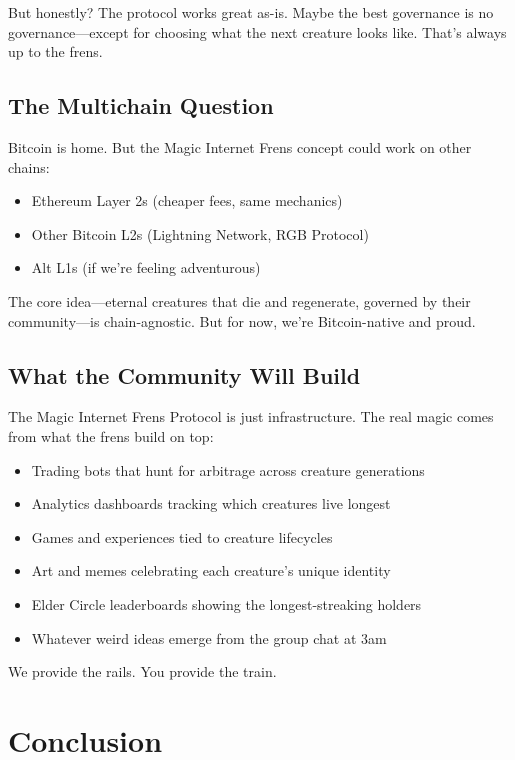 \documentclass[11pt,a4paper]{article}
\begin{document}
But honestly? The protocol works great as-is. Maybe the best governance is no governance---except for choosing what the next creature looks like. That's always up to the frens.

\subsection{The Multichain Question}

Bitcoin is home. But the Magic Internet Frens concept could work on other chains:

\begin{itemize}
    \item Ethereum Layer 2s (cheaper fees, same mechanics)
    \item Other Bitcoin L2s (Lightning Network, RGB Protocol)
    \item Alt L1s (if we're feeling adventurous)
\end{itemize}

The core idea---eternal creatures that die and regenerate, governed by their community---is chain-agnostic. But for now, we're Bitcoin-native and proud.

\subsection{What the Community Will Build}

The Magic Internet Frens Protocol is just infrastructure. The real magic comes from what the frens build on top:

\begin{itemize}
    \item Trading bots that hunt for arbitrage across creature generations
    \item Analytics dashboards tracking which creatures live longest
    \item Games and experiences tied to creature lifecycles
    \item Art and memes celebrating each creature's unique identity
    \item Elder Circle leaderboards showing the longest-streaking holders
    \item Whatever weird ideas emerge from the group chat at 3am
\end{itemize}

We provide the rails. You provide the train.

\section{Conclusion}
\end{document}
